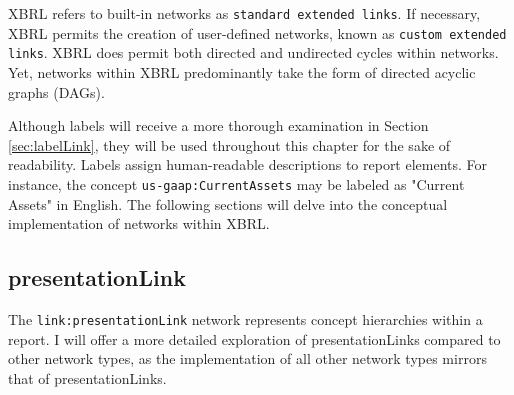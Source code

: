 XBRL refers to built-in networks as \texttt{standard extended links}.
If necessary, XBRL permits the creation of user-defined networks, known as \texttt{custom extended links}\cite{xbrl21_terminology}.
XBRL does permit both directed and undirected cycles within networks.
Yet, networks within XBRL predominantly take the form of directed acyclic graphs (DAGs).

Although labels will receive a more thorough examination in Section \ref{sec:labelLink}, they will be used throughout this chapter for the sake of readability.
Labels assign human-readable descriptions to report elements.
For instance, the concept \texttt{us-gaap:CurrentAssets} may be labeled as "Current Assets" in English.
The following sections will delve into the conceptual implementation of networks within XBRL.


\subsection{presentationLink}



The \texttt{link:presentationLink} network represents concept hierarchies within a report.
I will offer a more detailed exploration of presentationLinks compared to other network types,
as the implementation of all other network types mirrors that of presentationLinks.

